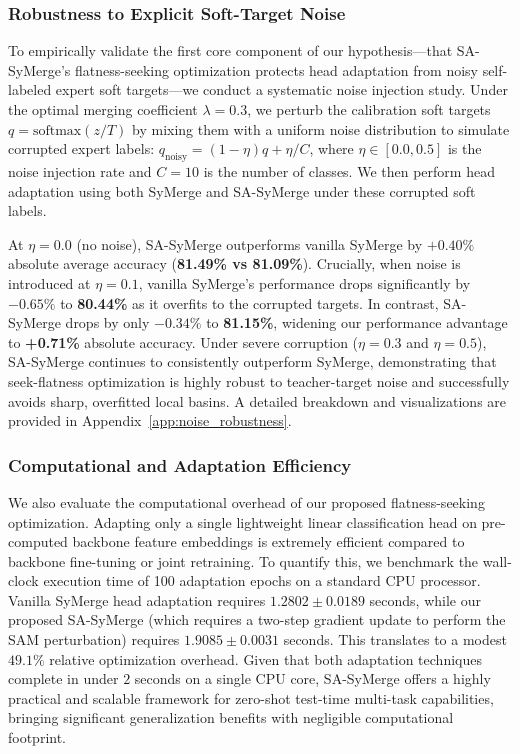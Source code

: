 \documentclass{article}
\theoremstyle{plain}
\theoremstyle{definition}
\theoremstyle{remark}
\begin{document}
\subsubsection{Robustness to Explicit Soft-Target Noise}
To empirically validate the first core component of our hypothesis---that SA-SyMerge's flatness-seeking optimization protects head adaptation from noisy self-labeled expert soft targets---we conduct a systematic noise injection study. Under the optimal merging coefficient $\lambda = 0.3$, we perturb the calibration soft targets $q = \text{softmax}(z / T)$ by mixing them with a uniform noise distribution to simulate corrupted expert labels: $q_{\text{noisy}} = (1 - \eta) q + \eta / C$, where $\eta \in [0.0, 0.5]$ is the noise injection rate and $C=10$ is the number of classes. We then perform head adaptation using both SyMerge and SA-SyMerge under these corrupted soft labels.

At $\eta = 0.0$ (no noise), SA-SyMerge outperforms vanilla SyMerge by $+0.40\%$ absolute average accuracy (\textbf{81.49\% vs 81.09\%}). Crucially, when noise is introduced at $\eta = 0.1$, vanilla SyMerge's performance drops significantly by $-0.65\%$ to \textbf{80.44\%} as it overfits to the corrupted targets. In contrast, SA-SyMerge drops by only $-0.34\%$ to \textbf{81.15\%}, widening our performance advantage to \textbf{+0.71\%} absolute accuracy. Under severe corruption ($\eta = 0.3$ and $\eta = 0.5$), SA-SyMerge continues to consistently outperform SyMerge, demonstrating that seek-flatness optimization is highly robust to teacher-target noise and successfully avoids sharp, overfitted local basins. A detailed breakdown and visualizations are provided in Appendix~\ref{app:noise_robustness}.

\subsubsection{Computational and Adaptation Efficiency}
We also evaluate the computational overhead of our proposed flatness-seeking optimization. Adapting only a single lightweight linear classification head on pre-computed backbone feature embeddings is extremely efficient compared to backbone fine-tuning or joint retraining. To quantify this, we benchmark the wall-clock execution time of 100 adaptation epochs on a standard CPU processor. Vanilla SyMerge head adaptation requires $1.2802 \pm 0.0189$ seconds, while our proposed SA-SyMerge (which requires a two-step gradient update to perform the SAM perturbation) requires $1.9085 \pm 0.0031$ seconds. This translates to a modest $49.1\%$ relative optimization overhead. Given that both adaptation techniques complete in under $2$ seconds on a single CPU core, SA-SyMerge offers a highly practical and scalable framework for zero-shot test-time multi-task capabilities, bringing significant generalization benefits with negligible computational footprint.
\end{document}
